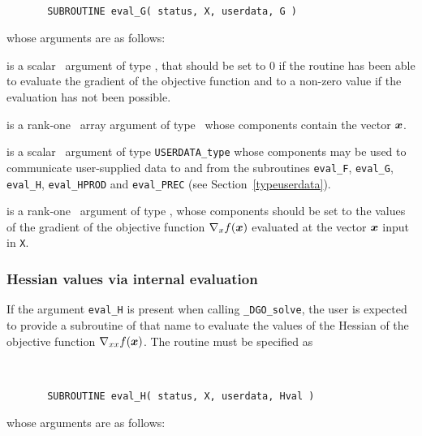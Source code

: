 \documentclass{galahad}
\newcommand{\packagename}{DGO}
\newcommand{\fullpackagename}{\libraryname\_\packagename}
\newcommand{\solver}{{\tt \fullpackagename\_solve}}
\begin{document}
\def\baselinestretch{0.8}
{\tt
\begin{verbatim}
       SUBROUTINE eval_G( status, X, userdata, G )
\end{verbatim} }
\def\baselinestretch{1.0}
\noindent whose arguments are as follows:

\begin{description}
 is a scalar \intentout\ argument of type \integer,
that should be set to 0 if the routine has been able to evaluate
the gradient of the objective function
and to a non-zero value if the evaluation has not been possible.

 is a rank-one \intentin\ array argument of type \realdp\
whose components contain the vector ${\bm{x}}$.

 is a scalar \intentinout\ argument of type
{\tt USERDATA\_type} whose components may be used
to communicate user-supplied data to and from the
subroutines {\tt eval\_F}, {\tt eval\_G},
{\tt eval\_H}, {\tt eval\_HPROD} and {\tt eval\_PREC}
(see Section~\ref{typeuserdata}).

 is a rank-one \intentout\ argument of type \realdp,
whose components should be set to the values of the gradient
of the objective function $\nabla_x f({\bm{x}})$
evaluated at the vector ${\bm{x}}$ input in {\tt X}.

\end{description}


\subsubsection{Hessian values via internal evaluation\label{hfv}}

If the argument {\tt eval\_H} is present when calling \solver, the
user is expected to provide a subroutine of that name to evaluate the
values of the Hessian of the objective function $\nabla_{xx} f({\bm{x}})$.
The routine must be specified as

\def\baselinestretch{0.8}
{\tt
\begin{verbatim}
       SUBROUTINE eval_H( status, X, userdata, Hval )
\end{verbatim} }
\def\baselinestretch{1.0}
\noindent whose arguments are as follows:
\end{document}
